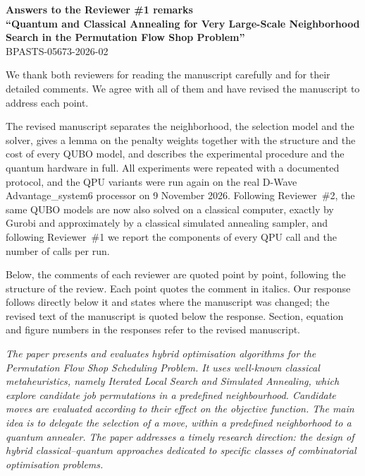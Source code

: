 \documentclass[12pt]{article}
\newenvironment{lead}{\par\medskip\noindent\itshape\renewcommand{\emph}[1]{\textbf{##1}}\ignorespaces}{\par}
\begin{document}
\begin{center}
{\bf Answers to the Reviewer \#1 remarks\\[2mm]
``Quantum and Classical Annealing for Very Large-Scale Neighborhood Search in the Permutation Flow Shop Problem''}\\
BPASTS-05673-2026-02\\[5mm]
\end{center}

We thank both reviewers for reading the manuscript carefully and for their detailed comments. We agree with all of them and have revised the manuscript to address each point.

The revised manuscript separates the neighborhood, the selection model and the solver, gives a lemma on the penalty weights together with the structure and the cost of every QUBO model, and describes the experimental procedure and the quantum hardware in full. All experiments were repeated with a documented protocol, and the QPU variants were run again on the real D-Wave Advantage\_system6 processor on 9 November 2026. Following Reviewer~\#2, the same QUBO models are now also solved on a classical computer, exactly by Gurobi and approximately by a classical simulated annealing sampler, and following Reviewer~\#1 we report the components of every QPU call and the number of calls per run.

Below, the comments of each reviewer are quoted point by point, following the structure of the review. Each point quotes the comment in italics. Our response follows directly below it and states where the manuscript was changed; the revised text of the manuscript is quoted below the response. Section, equation and figure numbers in the responses refer to the revised manuscript.

\begin{lead}
The paper presents and evaluates hybrid optimisation algorithms for the Permutation Flow Shop Scheduling Problem. It uses well-known classical metaheuristics, namely Iterated Local Search and Simulated Annealing, which explore candidate job permutations in a predefined neighbourhood. Candidate moves are evaluated according to their effect on the objective function. The main idea is to delegate the selection of a move, within a predefined neighborhood to a quantum annealer. The paper addresses a timely research direction: the design of hybrid classical--quantum approaches dedicated to specific classes of combinatorial optimisation problems.
\end{lead}
\end{document}
